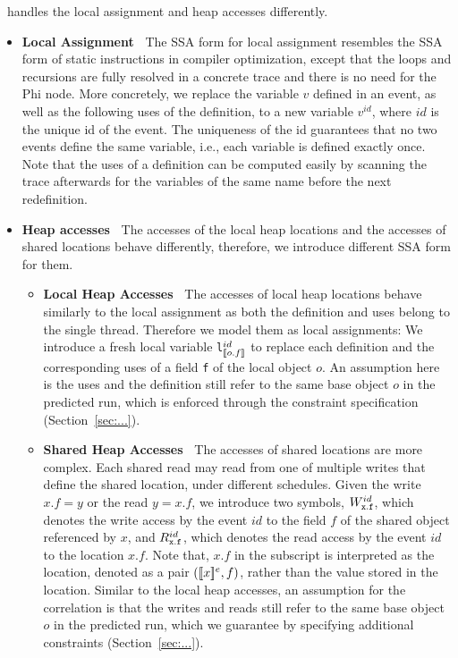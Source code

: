 \tool\ handles the local assignment and heap accesses differently.
\begin{itemize}
\item {\bf Local Assignment\ } The SSA form for local assignment resembles the SSA form of static instructions in compiler optimization, except that the loops and recursions are fully resolved in a concrete trace and there is no need for the Phi node. More concretely, we replace the variable $v$ defined in an event, as well as the following uses of the definition, to a new variable $v^{id}$, where $id$ is the unique id of the event. The uniqueness of the id guarantees that no two events define the same variable, i.e., each variable is defined exactly once. Note that the uses of a definition can be computed easily by scanning the trace afterwards for the variables of the same name before the next redefinition. 
\item {\bf Heap accesses\ } The accesses of the local heap locations and the accesses of shared locations behave differently, therefore, we introduce different SSA form for them. 
\begin{itemize}
\item {\bf Local Heap Accesses\ } The accesses of local heap locations behave similarly to the local assignment as both the definition and uses belong to the single thread. Therefore we model them as local assignments: We introduce a fresh local variable {\tt l$_{\lbrack\!\lbrack o.f \rbrack\!\rbrack}^{id}$} to replace each definition and  the corresponding uses of a  field {\tt f} of the local object $o$. An assumption here is the uses and the definition still refer to the same base object $o$ in the predicted run, which is enforced through the constraint specification (Section~\ref{sec:...}).
\item  {\bf Shared Heap Accesses\ } The accesses of shared locations are more complex. Each shared read may read from one of multiple writes that define the shared location, under different schedules.     Given the write $x.f=y$ or the read $y=x.f$, we introduce two symbols, $W^{id}_{\tt x.f }$, which denotes the write access by the event $id$ to the field $f$ of the shared object referenced by $x$, and $R^{id}_{\tt  x.f }$,  which denotes the read access  by the event $id$ to the location $x.f$.  Note that, $x.f$ in the subscript is interpreted as the location, denoted as a pair $(\lbrack\!\lbrack x \rbrack\!\rbrack^e, f)$, rather than the value stored in the location. 
Similar to the local heap accesses, an assumption for the correlation is that the writes and reads still refer to the same base object $o$ in the predicted run, which we guarantee by specifying additional constraints (Section~\ref{sec:...}). 
\end{itemize}
\end{itemize}


